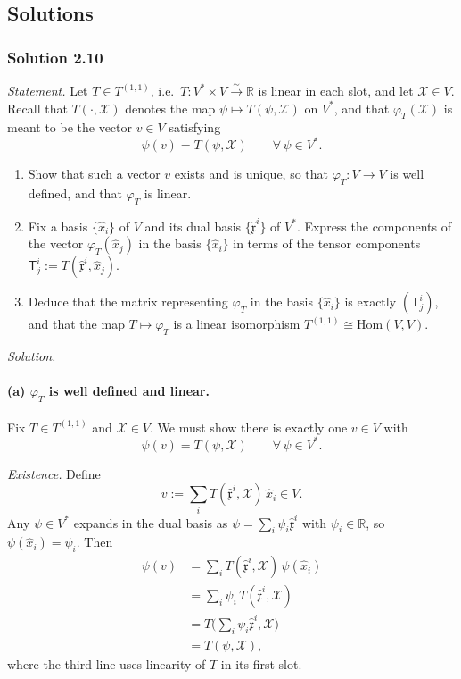 \documentclass[11pt]{article}
\newcommand{\dual}{V^{*}}
\newcommand{\linto}{\overset{\sim}{\longrightarrow}}
\begin{document}
\subsection*{Solutions}

\subsubsection*{Solution 2.10}

\noindent\textit{Statement.} Let $T\in T^{(1,1)}$, i.e.\ $T:\dual\times V\linto\mathbb R$ is linear in each slot, and let $\mathcal X\in V$. Recall that $T(\cdot,\mathcal X)$ denotes the map $\psi\mapsto T(\psi,\mathcal X)$ on $\dual$, and that $\varphi_T(\mathcal X)$ is meant to be the vector $v\in V$ satisfying
\[
\psi(v)=T(\psi,\mathcal X)\qquad\forall\,\psi\in\dual.
\]
\begin{enumerate}[label=(\alph*)]
  \item Show that such a vector $v$ exists and is unique, so that $\varphi_T:V\to V$ is well defined, and that $\varphi_T$ is linear.
  \item Fix a basis $\{\hat{x}_i\}$ of $V$ and its dual basis $\{\hat{\mathfrak{x}}^i\}$ of $\dual$. Express the components of the vector $\varphi_T(\hat{x}_j)$ in the basis $\{\hat{x}_i\}$ in terms of the tensor components $\mathsf{T}^i_j := T(\hat{\mathfrak{x}}^i, \hat{x}_j)$.
  \item Deduce that the matrix representing $\varphi_T$ in the basis $\{\hat{x}_i\}$ is exactly $(\mathsf{T}^i_j)$, and that the map $T \mapsto \varphi_T$ is a linear isomorphism $T^{(1,1)} \cong \mathrm{Hom}(V,V)$.
\end{enumerate}

\medskip
\noindent\textit{Solution.}

\paragraph{(a) $\varphi_T$ is well defined and linear.}
Fix $T\in T^{(1,1)}$ and $\mathcal X\in V$. We must show there is exactly one $v\in V$ with
\[
\psi(v)=T(\psi,\mathcal X)\qquad\forall\,\psi\in\dual. \tag{2.4}\label{eq:2-riesz}
\]

\noindent\emph{Existence.} Define
\[
v:=\sum_i T(\hat{\mathfrak x}^i,\mathcal X)\,\hat x_i\in V.
\]
Any $\psi\in\dual$ expands in the dual basis as $\psi=\sum_i\psi_i\hat{\mathfrak x}^i$ with $\psi_i\in\mathbb R$, so $\psi(\hat x_i)=\psi_i$. Then
\begin{align*}
\psi(v)&=\sum_i T(\hat{\mathfrak x}^i,\mathcal X)\,\psi(\hat x_i)\\
&=\sum_i \psi_i\,T(\hat{\mathfrak x}^i,\mathcal X)\\
&=T\Big(\sum_i\psi_i\hat{\mathfrak x}^i,\mathcal X\Big)\\
&=T(\psi,\mathcal X),
\end{align*}
where the third line uses linearity of $T$ in its first slot.
\end{document}

